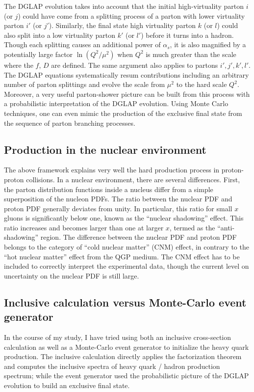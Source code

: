The DGLAP evolution takes into account that the initial high-virtuality parton $i$ (or $j$) could have come from a splitting process of a parton with lower virtuality parton $i'$ (or $j'$).
Similarly, the final state high virtuality parton $k$ (or $l$) could also split into a low virtuality parton $k'$ (or $l'$) before it turns into a hadron.
Though each splitting causes an additional power of $\alpha_s$, it is also magnified by a potentially large factor $\ln (Q^2/\mu^2)$ when $Q^2$ is much greater than the scale where the $f$, $D$ are defined.
The same argument also applies to partons $i', j', k', l'$. 
The DGLAP equations systematically resum contributions including an arbitrary number of parton splittings and evolve the scale from $\mu^2$ to the hard scale $Q^2$.
Moreover, a very useful parton-shower picture can be built from this process with a probabilistic interpretation of the DGLAP evolution. Using Monte Carlo techniques, one can even mimic the production of the exclusive final state from the sequence of parton branching processes.

\subsection{Production in the nuclear environment}
The above framework explains very well the hard production process in proton-proton collisions.
In a nuclear environment, there are several differences.
First, the parton distribution functions inside a nucleus differ from a simple superposition of the nucleon PDFs.
The ratio between the nuclear PDF and proton PDF generally deviates from unity.
In particular, this ratio for small $x$ gluons is significantly below one, known as the ``nuclear shadowing'' effect. 
This ratio increases and becomes larger than one at larger $x$, termed as the ``anti-shadowing'' region.
The difference between the nuclear PDF and proton PDF belongs to the category of ``cold nuclear matter'' (CNM) effect, in contrary to the ``hot nuclear matter'' effect from the QGP medium.
The CNM effect has to be included to correctly interpret the experimental data, though the current level on uncertainty on the nuclear PDF is still large.

\subsection{Inclusive calculation versus Monte-Carlo event generator}
In the course of my study, I have tried using both an inclusive cross-section calculation as well as a Monte-Carlo event generator to initialize the heavy quark production.
The inclusive calculation directly applies the factorization theorem and computes the inclusive spectra of heavy quark / hadron production spectrum; while the event generator used the probabilistic picture of the DGLAP evolution to build an exclusive final state.

